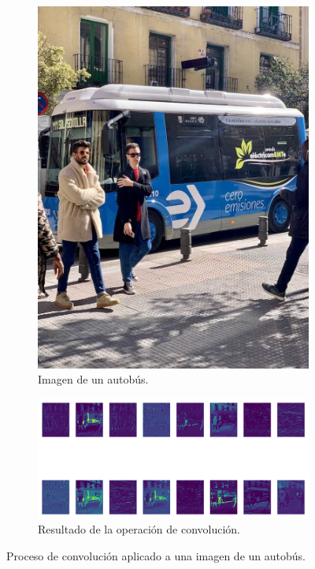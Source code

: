 \documentclass[11pt,spanish,listoffigures,listoftables]{tfgetsinf}
\begin{document}
\begin{figure}[H]
   \centering
   \begin{subfigure}[b]{0.25\textwidth}
      \centering
      \includegraphics[width=\textwidth]{images/estado_del_arte/bus_original.jpg}
      \caption[Imagen de un autobús]{Imagen de un autobús.}
      \label{fig:bus_original}
   \end{subfigure}
   \hfill
   \begin{subfigure}[b]{0.7\textwidth}
      \centering
      \includegraphics[width=\textwidth]{images/estado_del_arte/bus_primera_capa_convolucion.png}
      \caption[Resultado de la operación de convolución]{Resultado de la operación de convolución.}
      \label{fig:bus_primera_capa_convolucion}
   \end{subfigure}
   \caption[Proceso de convolución aplicado a una imagen de un autobús]{Proceso de convolución aplicado a una imagen de un autobús.}
   \label{fig:bus_convolucion}
\end{figure}
\end{document}

